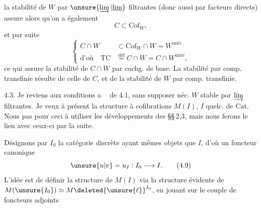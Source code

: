 
la stabilité de $W$ par $\unsure{\varinjlim|\underline{\lim}}$ filtrantes (donc aussi par facteurs directs) assure alors qu'on a également
\[
C\subset\mathrm{Cof}_W,\tag*{(4.7)}
\]
et par suite
\[
\left\{\begin{aligned} C\cap W&\subset\mathrm{Cof}_W\cap W=W^{\mathrm{univ}}\\ \text{d'où}\quad \mathrm{TC}&\overset{\mathrm{déf}}{=}C\cap W=C\cap W^{\mathrm{univ}},
\end{aligned}\right.\tag*{(4.8)}
\]
ce qui assure la stabilité de $C\cap W$ par cochg. de base. La stabilité  par comp. transfinie résulte de celle de $C$, et de la stabilité de $W$ par comp. transfinie.

4.3. Je reviens aux conditions  \textcircled{a}  \textcircled{} de 4.1, sans supposer néc. $W$ stable par $\varinjlim$ filtrantes. Je veux à présent  la structure à cofibrations  $M(I)$, $I$ quelc. de $\mathrm{Cat}$. Nous  pas pour ceci  à utiliser les développements des \S\S\,2,3, mais nous ferons le lien avec ceux-ci par la suite. 

Désignons par $I_0$ la catégorie discrète ayant mêmes objets que $I$, d'où un foncteur canonique
\[
\unsure{u|v}=u_I:I_0\longrightarrow I.\tag*{(4.9)}
\]
L'idée est de définir la structure de $M(I)$ via la structure évidente de $M(\unsure{I_0})\simeq M\deleted{\unsure{\ell}}^{I_0}$, en jouant sur le couple de foncteurs adjoints
